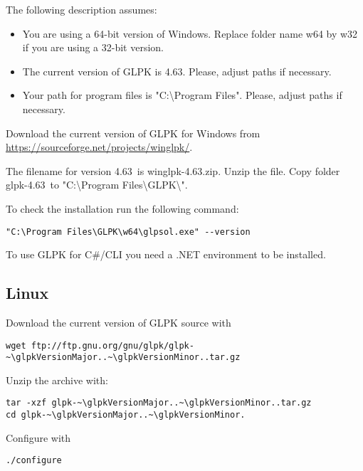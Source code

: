\documentclass[a4paper,11pt]{report}
\newcommand{\glpkVersionMajor}{4}
\newcommand{\glpkVersionMinor}{63}
\begin{document}
The following description assumes:

\begin{itemize}
\item You are using a 64-bit version of Windows. Replace folder name w64 by w32
if you are using a 32-bit version.
\item The current version of GLPK is \glpkVersionMajor.\glpkVersionMinor.
Please, adjust paths if necessary.
\item Your path for program files is "C:\textbackslash Program Files". Please,
adjust paths if necessary.
\end{itemize}

Download the current version of GLPK for Windows from
\href{https://sourceforge.net/projects/winglpk/}{https://sourceforge.net/projects/winglpk/}.

The filename for version \glpkVersionMajor.\glpkVersionMinor\ is
winglpk-\glpkVersionMajor.\glpkVersionMinor.zip. Unzip the file. Copy folder
glpk-\glpkVersionMajor.\glpkVersionMinor\ to "C:\textbackslash Program
Files\textbackslash GLPK\textbackslash ".

To check the installation run the following command:

\begin{lstlisting}
"C:\Program Files\GLPK\w64\glpsol.exe" --version
\end{lstlisting}

To use GLPK for C\#/CLI you need a .NET environment to be installed.

\subsection{Linux}

Download the current version of GLPK source with

\begin{lstlisting}
wget ftp://ftp.gnu.org/gnu/glpk/glpk-~\glpkVersionMajor..~\glpkVersionMinor..tar.gz
\end{lstlisting}

Unzip the archive with:

\begin{lstlisting}
tar -xzf glpk-~\glpkVersionMajor..~\glpkVersionMinor..tar.gz
cd glpk-~\glpkVersionMajor..~\glpkVersionMinor.
\end{lstlisting}

Configure with

\begin{lstlisting}
./configure
\end{lstlisting}
\end{document}

